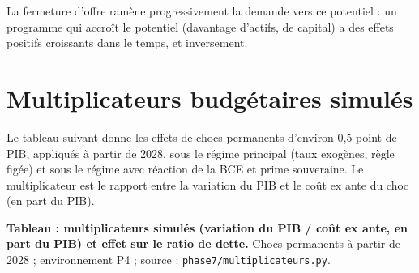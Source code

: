 \documentclass[
  11pt,
  11pt,
  a4paper,
  openany]{book}
\begin{document}
La fermeture d'offre ramène progressivement la demande vers ce potentiel
: un programme qui accroît le potentiel (davantage d'actifs, de capital)
a des effets positifs croissants dans le temps, et inversement.

\hypertarget{sec:multiplicateurs}{%
\section{Multiplicateurs budgétaires
simulés}\label{sec:multiplicateurs}}

Le tableau suivant donne les effets de chocs permanents d'environ 0,5
point de PIB, appliqués à partir de 2028, sous le régime principal (taux
exogènes, règle figée) et sous le régime avec réaction de la BCE et
prime souveraine. Le multiplicateur est le rapport entre la variation du
PIB et le coût ex ante du choc (en part du PIB).

\textbf{Tableau : multiplicateurs simulés (variation du PIB / coût ex
ante, en part du PIB) et effet sur le ratio de dette.} Chocs permanents
à partir de 2028 ; environnement P4 ; source :
\texttt{phase7/multiplicateurs.py}.
\end{document}
